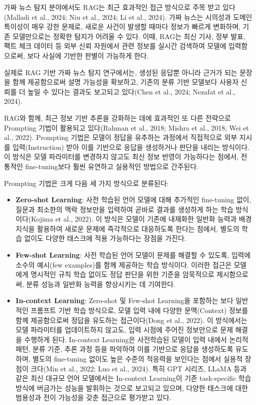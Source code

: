 \documentclass[a4paper,fleqn]{cas-sc}
\begin{document}
가짜 뉴스 탐지 분야에서도 RAG는 최근 효과적인 접근 방식으로 주목 받고 있다(Malladi et al., 2024; Niu et al., 2024; Li et al., 2024). 가짜 뉴스는 시의성과 도메인 특이성이 매우 강한 문제로, 새로운 사건이 발생할 때마다 정보가 빠르게 변화하며, 기존 모델만으로는 정확한 탐지가 어려울 수 있다. 이때, RAG는 최신 기사, 정부 발표, 팩트 체크 데이터 등 외부 신뢰 자원에서 관련 정보를 실시간 검색하여 모델에 입력함으로써, 보다 사실에 기반한 판별이 가능하게 한다.

실제로 RAG 기반 가짜 뉴스 탐지 연구에서는, 생성된 응답뿐 아니라 근거가 되는 문장을 함께 제공함으로써 설명 가능성을 확보하고, 기존의 분류 기반 모델보다 사용자 신뢰를 더 높일 수 있다는 결과도 보고되고 있다(Chen et al., 2024; Nezafat et al., 2024).

RAG와 함께, 최근 정보 기반 추론을 강화하는 데에 효과적인 또 다른 전략으로 Prompting 기법이 활용되고 있다(Rahman et al., 2018; Mishra et al., 2018; Wei et al., 2022). Prompting 기법은 모델이 정답을 유추하는 과정에서 직접적으로 외부 지시를 입력(Instruction) 받아 이를 기반으로 응답을 생성하거나 판단을 내리는 방식이다. 이 방식은 모델 파라미터를 변경하지 않고도 최신 정보 반영이 가능하다는 점에서, 전통적인 fine-tuning보다 훨씬 유연하고 실용적인 방법으로 간주된다.

Prompting 기법은 크게 다음 세 가지 방식으로 분류된다:
\begin{itemize}
    \item{\textbf{Zero-shot Learning}:
    사전 학습된 언어 모델에 대해 추가적인 fine-tuning 없이, 질문과 최소한의 맥락 정보만을 입력하여 곧바로 결과를 생성하게 하는 학습 방식이다(Kojima et al., 2022). 이 방식은 모델이 기존에 내재화한 일반화 능력과 배경 지식을 활용하여 새로운 문제에 즉각적으로 대응하도록 한다는 점에서, 별도의 학습 없이도 다양한 태스크에 적용 가능하다는 장점을 가진다.}
    \item{\textbf{Few-shot Learning}:
    사전 학습된 언어 모델이 문제를 해결할 수 있도록, 입력에 소수의 예시(few examples)를 함께 제공하는 학습 방식이다. 이러한 접근은 모델에게 명시적인 규칙 학습 없이도 정답 판단을 위한 기준을 암묵적으로 제시함으로써, 분류 성능과 일반화 능력을 향상시키는 데 기여한다.}
    \item{\textbf{In-context Learning}:
    Zero-shot 및 Few-shot Learning을 포함하는 보다 일반적인 프롬프트 기반 학습 방식으로, 모델 입력 내에 다양한 문맥(Context) 정보를 함께 제공함으로써 정답을 유도하는 접근이다(Dong et al., 2022). 이 방식에서는 모델 파라미터를 업데이트하지 않고도, 입력 시점에 주어진 정보만으로 문제 해결을 수행하게 된다. In-context Learning은 사전학습된 모델이 입력 내에서 논리적 패턴, 분류 기준, 추론 과정 등을 파악하여 이를 기반으로 응답을 생성하도록 유도하며, 별도의 fine-tuning 없이도 높은 수준의 적응력을 보인다는 점에서 실용적 장점이 크다(Min et al., 2022; Luo et al., 2024). 특히 GPT 시리즈, LLaMA 등과 같은 최신 대규모 언어 모델에서는 In-context Learning이 기존 task-specific 학습 방식에 버금가는 성능을 발휘하는 것으로 보고되고 있으며, 다양한 태스크에 대한 범용성과 전이 가능성을 갖춘 접근으로 평가받고 있다.}
\end{itemize}
\end{document}

